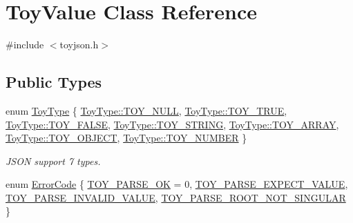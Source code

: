 \hypertarget{classToyValue}{}\section{Toy\+Value Class Reference}
\label{classToyValue}


{\ttfamily \#include $<$toyjson.\+h$>$}

\subsection*{Public Types}
\begin{DoxyCompactItemize}
\item 
enum \hyperlink{classToyValue_afe40e1c745e0cc296066ae27f9d7f9fb}{Toy\+Type} \{ \newline
\hyperlink{classToyValue_afe40e1c745e0cc296066ae27f9d7f9fba843935140d865476e8baba056d92824d}{Toy\+Type\+::\+T\+O\+Y\+\_\+\+N\+U\+LL}, 
\hyperlink{classToyValue_afe40e1c745e0cc296066ae27f9d7f9fbab7ffbf589ffae9efd0e6e9c97c587fa7}{Toy\+Type\+::\+T\+O\+Y\+\_\+\+T\+R\+UE}, 
\hyperlink{classToyValue_afe40e1c745e0cc296066ae27f9d7f9fbae7e0e6a03abb0ca5a29163cf1e0844bd}{Toy\+Type\+::\+T\+O\+Y\+\_\+\+F\+A\+L\+SE}, 
\hyperlink{classToyValue_afe40e1c745e0cc296066ae27f9d7f9fba8eb7be2e9307ebc5979ceaa007023a1c}{Toy\+Type\+::\+T\+O\+Y\+\_\+\+S\+T\+R\+I\+NG}, 
\newline
\hyperlink{classToyValue_afe40e1c745e0cc296066ae27f9d7f9fba1ec2135b2ca1913648a4dfaa8ea8d83e}{Toy\+Type\+::\+T\+O\+Y\+\_\+\+A\+R\+R\+AY}, 
\hyperlink{classToyValue_afe40e1c745e0cc296066ae27f9d7f9fbae599d1d1144996b37a7844ae668c3dcc}{Toy\+Type\+::\+T\+O\+Y\+\_\+\+O\+B\+J\+E\+CT}, 
\hyperlink{classToyValue_afe40e1c745e0cc296066ae27f9d7f9fbaf0cff563fe30e59bf65d7e8793f1ec0c}{Toy\+Type\+::\+T\+O\+Y\+\_\+\+N\+U\+M\+B\+ER}
 \}\begin{DoxyCompactList}\small\item\em J\+S\+ON support 7 types. \end{DoxyCompactList}
\item 
enum \hyperlink{classToyValue_a31b548920488141921c06e2825c6e2f1}{Error\+Code} \{ \hyperlink{classToyValue_a31b548920488141921c06e2825c6e2f1a2067cd73353a1899d3f3fe483f34ee88}{T\+O\+Y\+\_\+\+P\+A\+R\+S\+E\+\_\+\+OK} = 0, 
\hyperlink{classToyValue_a31b548920488141921c06e2825c6e2f1a6909e232aacd68d282bc4e8dd1d27c4d}{T\+O\+Y\+\_\+\+P\+A\+R\+S\+E\+\_\+\+E\+X\+P\+E\+C\+T\+\_\+\+V\+A\+L\+UE}, 
\hyperlink{classToyValue_a31b548920488141921c06e2825c6e2f1a2b7f295f378702f2f93881711584c3c2}{T\+O\+Y\+\_\+\+P\+A\+R\+S\+E\+\_\+\+I\+N\+V\+A\+L\+I\+D\+\_\+\+V\+A\+L\+UE}, 
\hyperlink{classToyValue_a31b548920488141921c06e2825c6e2f1ab792152f5bc6ec63878847779fb83158}{T\+O\+Y\+\_\+\+P\+A\+R\+S\+E\+\_\+\+R\+O\+O\+T\+\_\+\+N\+O\+T\+\_\+\+S\+I\+N\+G\+U\+L\+AR}
 \}
\end{DoxyCompactItemize}
